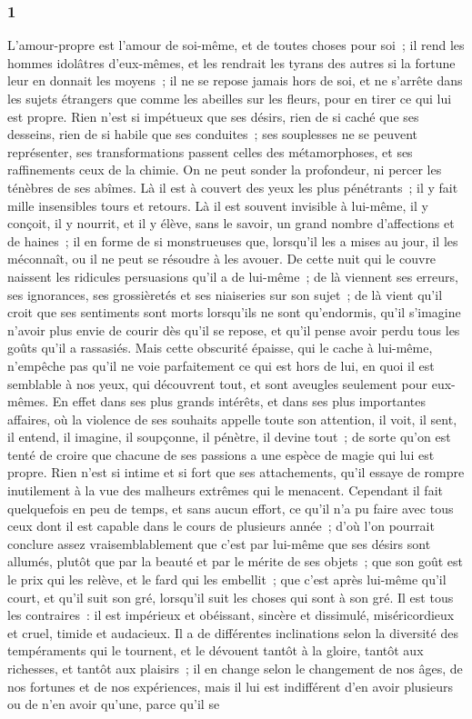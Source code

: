 \documentclass[french,twoside]{book} %
\begin{document}
\subsubsection[{1}]{ \textsc{1} }
\noindent L’amour-propre est l’amour de soi-même, et de toutes choses pour soi ; il rend les hommes idolâtres d’eux-mêmes, et les rendrait les tyrans des autres si la fortune leur en donnait les moyens ; il ne se repose jamais hors de soi, et ne s’arrête dans les sujets étrangers que comme les abeilles sur les fleurs, pour en tirer ce qui lui est propre. Rien n’est si impétueux que ses désirs, rien de si caché que ses desseins, rien de si habile que ses conduites ; ses souplesses ne se peuvent représenter, ses transformations passent celles des métamorphoses, et ses raffinements ceux de la chimie. On ne peut sonder la profondeur, ni percer les ténèbres de ses abîmes. Là il est à couvert des yeux les plus pénétrants ; il y fait mille insensibles tours et retours. Là il est souvent invisible à lui-même, il y conçoit, il y nourrit, et il y élève, sans le savoir, un grand nombre d’affections et de haines ; il en forme de si monstrueuses que, lorsqu’il les a mises au jour, il les méconnaît, ou il ne peut se résoudre à les avouer. De cette nuit qui le couvre naissent les ridicules persuasions qu’il a de lui-même ; de là viennent ses erreurs, ses ignorances, ses grossièretés et ses niaiseries sur son sujet ; de là vient qu’il croit que ses sentiments sont morts lorsqu’ils ne sont qu’endormis, qu’il s’imagine n’avoir plus envie de courir dès qu’il se repose, et qu’il pense avoir perdu tous les goûts qu’il a rassasiés. Mais cette obscurité épaisse, qui le cache à lui-même, n’empêche pas qu’il ne voie parfaitement ce qui est hors de lui, en quoi il est semblable à nos yeux, qui découvrent tout, et sont aveugles seulement pour eux-mêmes. En effet dans ses plus grands intérêts, et dans ses plus importantes affaires, où la violence de ses souhaits appelle toute son attention, il voit, il sent, il entend, il imagine, il soupçonne, il pénètre, il devine tout ; de sorte qu’on est tenté de croire que chacune de ses passions a une espèce de magie qui lui est propre. Rien n’est si intime et si fort que ses attachements, qu’il essaye de rompre inutilement à la vue des malheurs extrêmes qui le menacent. Cependant il fait quelquefois en peu de temps, et sans aucun effort, ce qu’il n’a pu faire avec tous ceux dont il est capable dans le cours de plusieurs année ; d’où l’on pourrait conclure assez vraisemblablement que c’est par lui-même que ses désirs sont allumés, plutôt que par la beauté et par le mérite de ses objets ; que son goût est le prix qui les relève, et le fard qui les embellit ; que c’est après lui-même qu’il court, et qu’il suit son gré, lorsqu’il suit les choses qui sont à son gré. Il est tous les contraires : il est impérieux et obéissant, sincère et dissimulé, miséricordieux et cruel, timide et audacieux. Il a de différentes inclinations selon la diversité des tempéraments qui le tournent, et le dévouent tantôt à la gloire, tantôt aux richesses, et tantôt aux plaisirs ; il en change selon le changement de nos âges, de nos fortunes et de nos expériences, mais il lui est indifférent d’en avoir plusieurs ou de n’en avoir qu’une, parce qu’il se 
\end{document}
